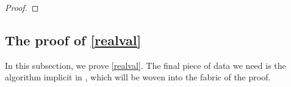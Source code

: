 \documentclass[12pt]{amsart}
\newcommand{\mb}{\mathbb}
\theoremstyle{plain}
\theoremstyle{definition}
\theoremstyle{remark}
\begin{document}
\begin{proof}

\end{proof}



\subsection{The proof of \cref{realval}}
In this subsection, we prove \cref{realval}. The final piece of data we need is the algorithm implicit in \cite[Appendix A]{Derksen}, which will be woven into the fabric of the proof.
\end{document}
